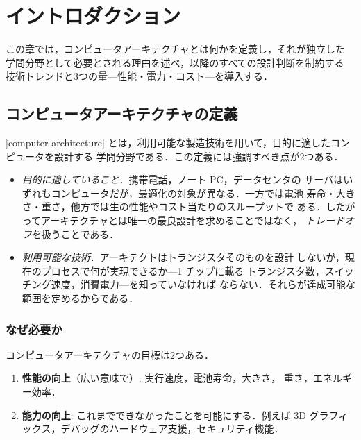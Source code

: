 \documentclass[../main.tex]{subfiles}
\begin{document}
\chapter{イントロダクション}

この章では，コンピュータアーキテクチャとは何かを定義し，それが独立した
学問分野として必要とされる理由を述べ，以降のすべての設計判断を制約する
技術トレンドと3つの量---性能・電力・コスト---を導入する．

\section{コンピュータアーキテクチャの定義}

[computer architecture]
とは，利用可能な製造技術を用いて，目的に適したコンピュータを設計する
学問分野である．この定義には強調すべき点が2つある．

\begin{itemize}
  \item \emph{目的に適していること}．携帯電話，ノート PC，データセンタの
    サーバはいずれもコンピュータだが，最適化の対象が異なる．一方では電池
    寿命・大きさ・重さ，他方では生の性能やコスト当たりのスループットで
    ある．したがってアーキテクチャとは唯一の最良設計を求めることではなく，
    \emph{トレードオフ}を扱うことである．
  \item \emph{利用可能な技術}．アーキテクトはトランジスタそのものを設計
    しないが，現在のプロセスで何が実現できるか---1 チップに載る
    トランジスタ数，スイッチング速度，消費電力---を知っていなければ
    ならない．それらが達成可能な範囲を定めるからである．
\end{itemize}

\subsection{なぜ必要か}

コンピュータアーキテクチャの目標は2つある．
\begin{enumerate}
  \item \textbf{性能の向上}（広い意味で）: 実行速度，電池寿命，大きさ，
    重さ，エネルギー効率．
  \item \textbf{能力の向上}: これまでできなかったことを可能にする．例えば
    3D グラフィックス，デバッグのハードウェア支援，セキュリティ機能．
\end{enumerate}
\end{document}

